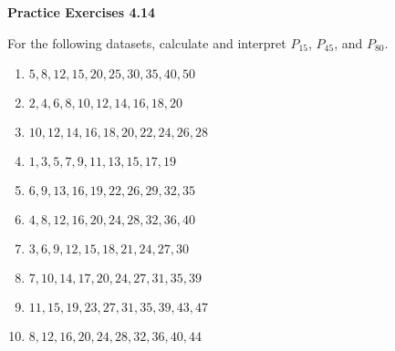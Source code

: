 \vspace{0.3ex}
\noindent\textbf{Practice Exercises 4.14}

\vspace{0.2ex}

For the following datasets, calculate and interpret \(P_{15}\), \(P_{45}\), and \(P_{80}\).

\begin{enumerate}
    \item \(5, 8, 12, 15, 20, 25, 30, 35, 40, 50\)  
    \item \(2, 4, 6, 8, 10, 12, 14, 16, 18, 20\)  
    \item \(10, 12, 14, 16, 18, 20, 22, 24, 26, 28\)  
    \item \(1, 3, 5, 7, 9, 11, 13, 15, 17, 19\)  
    \item \(6, 9, 13, 16, 19, 22, 26, 29, 32, 35\)  
    \item \(4, 8, 12, 16, 20, 24, 28, 32, 36, 40\)  
    \item \(3, 6, 9, 12, 15, 18, 21, 24, 27, 30\)  
    \item \(7, 10, 14, 17, 20, 24, 27, 31, 35, 39\)  
    \item \(11, 15, 19, 23, 27, 31, 35, 39, 43, 47\)  
    \item \(8, 12, 16, 20, 24, 28, 32, 36, 40, 44\)  
\end{enumerate}
